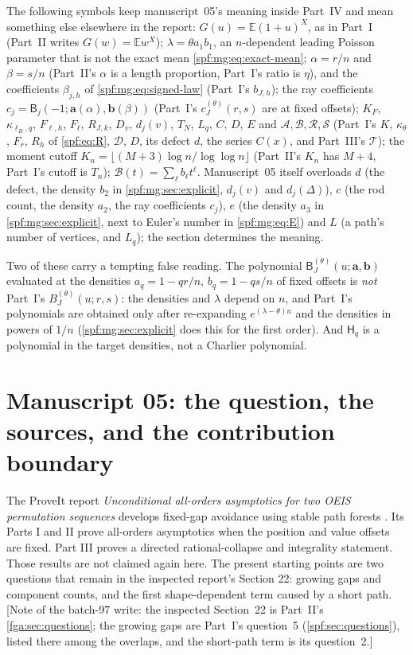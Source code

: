 \documentclass[11pt]{article}
\numberwithin{equation}{section}
\theoremstyle{definition}
\theoremstyle{remark}
\theoremstyle{definition}
\newcommand{\E}{\mathbb E}
\newcommand{\mga}{\boldsymbol a}
\newcommand{\mgb}{\boldsymbol b}
\newcommand{\mgl}{\boldsymbol\ell}
\begin{document}
The following symbols keep manuscript~05's meaning inside Part~IV and mean
something else elsewhere in the report: $G(u)=\E(1+u)^X$, as in Part~I (Part~II
writes $G(w)=\E w^X$); $\lambda=\theta a_1b_1$, an $n$-dependent leading
Poisson parameter that is not the exact mean \eqref{spf:mg:eq:exact-mean};
$\alpha=r/n$ and $\beta=s/n$ (Part~II's $\alpha$ is a length proportion,
Part~I's ratio is $\eta$), and the coefficients $\beta_{j,h}$ of
\eqref{spf:mg:eq:signed-law} (Part~I's $b_{J,h}$); the ray coefficients
$c_j=\mathsf B_j(-1;\mga(\alpha),\mgb(\beta))$ (Part~I's $c_J^{(\theta)}(r,s)$
are at fixed offsets); $K_F$, $\kappa_{\ell_B,q}$, $F_{\mgl,h}$, $F_{\mgl}$,
$R_{J,k}$, $D_v$, $d_j(v)$, $T_N$, $L_q$, $C$, $D$, $E$ and
$\mathcal A,\mathcal B,\mathcal R,\mathcal S$ (Part~I's $K$, $\kappa_\theta$,
$F_r$, $R_h$ of \eqref{spf:eq:R}, $\mathcal D$, $D$, its defect $d$, the series
$C(x)$, and Part~III's $\mathcal T$); the moment cutoff
$K_n=\lfloor(M+3)\log n/\log\log n\rfloor$ (Part~II's $K_n$ has $M+4$, Part~I's
cutoff is $T_n$); $\mathscr B(t)=\sum_\ell b_\ell t^\ell$. Manuscript~05 itself
overloads $d$ (the defect, the density $b_2$ in \cref{spf:mg:sec:explicit},
$d_j(v)$ and $d_j(\Delta)$), $c$ (the rod count, the density $a_2$, the ray
coefficients $c_j$), $e$ (the density $a_3$ in \cref{spf:mg:sec:explicit},
next to Euler's number in \eqref{spf:mg:eq:E}) and $L$ (a path's number of
vertices, and $L_q$); the section determines the meaning.

Two of these carry a tempting false reading. The polynomial
$\mathsf B_J^{(\theta)}(u;\mga,\mgb)$ evaluated at the densities
$a_q=1-qr/n$, $b_q=1-qs/n$ of fixed offsets is \emph{not} Part~I's
$B_J^{(\theta)}(u;r,s)$: the densities and $\lambda$ depend on $n$, and Part~I's
polynomials are obtained only after re-expanding $e^{(\lambda-\theta)u}$ and
the densities in powers of $1/n$ (\cref{spf:mg:sec:explicit} does this for the
first order). And $\mathsf H_q$ is a polynomial in the target densities, not a
Charlier polynomial.

\section{Manuscript 05: the question, the sources, and the contribution boundary}
\label{spf:mg:sec:context}

The ProveIt report \emph{Unconditional all-orders asymptotics for two OEIS
permutation sequences} develops fixed-gap avoidance using stable path
forests \cite{mgProveIt}. Its Parts I and II prove all-orders asymptotics when
the position and value offsets are fixed. Part III proves a directed
rational-collapse and integrality statement. Those results are not claimed
again here. The present starting points are two questions that remain in
the inspected report's Section 22: growing gaps and component counts, and
the first shape-dependent term caused by a short path.
[Note of the batch-97 write: the inspected Section~22 is Part~II's
\cref{fga:sec:questions}; the growing gaps are Part~I's question~5
(\cref{spf:sec:questions}), listed there among the overlaps, and the
short-path term is its question~2.]
\end{document}
